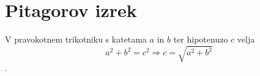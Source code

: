 \documentclass{article}
\begin{document}
\section*{Pitagorov izrek}
V pravokotnem trikotniku s katetama \(a\) in \(b\) ter hipotenuzo \(c\) velja
\[ a^2 + b^2 = c^2 \Rightarrow c=\sqrt{a^2+b^2} \].
\end{document}
